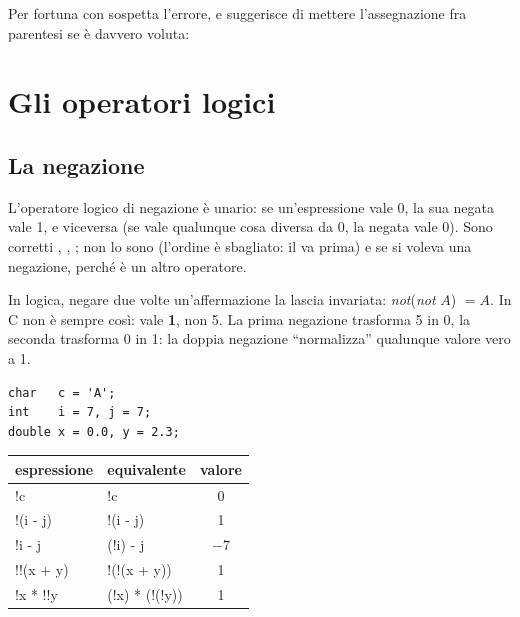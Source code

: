 Per fortuna  con  sospetta l'errore, e suggerisce di
mettere l'assegnazione fra parentesi se è davvero voluta:


\section{Gli operatori logici}

\subsection{La negazione}

L'operatore logico di negazione \code{!} è unario: se un'espressione vale 0,
la sua negata vale 1, e viceversa (se vale qualunque cosa diversa da 0, la
negata vale 0). Sono corretti , ,
; non lo sono  (l'ordine è sbagliato: il
\code{!} va prima) e  se si voleva una negazione, perché
\code{!=} è un altro operatore.

In logica, negare due volte un'affermazione la lascia invariata:
\textit{not}(\textit{not} $A$) $= A$. In C non è sempre così:  vale
\textbf{1}, non 5. La prima negazione trasforma 5 in 0, la seconda trasforma
0 in 1: la doppia negazione “normalizza” qualunque valore vero a 1.

\begin{affianco}[0.36][c]
\begin{lstlisting}[style=c]
char   c = 'A';
int    i = 7, j = 7;
double x = 0.0, y = 2.3;
\end{lstlisting}
\risultato
\begin{center}
\renewcommand{\arraystretch}{1.12}
\begin{tabular}{@{}>{\FiraCodeNL}l>{\FiraCodeNL}l c@{}}
  \toprule
  \normalfont\textbf{espressione} & \normalfont\textbf{equivalente} & \textbf{valore} \\
  \midrule
  !c        & !c                 & 0 \\
  !(i - j)  & !(i - j)           & 1 \\
  !i - j    & (!i) - j           & $-7$ \\
  !!(x + y) & !(!(x + y))        & 1 \\
  !x * !!y  & (!x) * (!(!y))     & 1 \\
  \bottomrule
\end{tabular}
\end{center}
\end{affianco}

